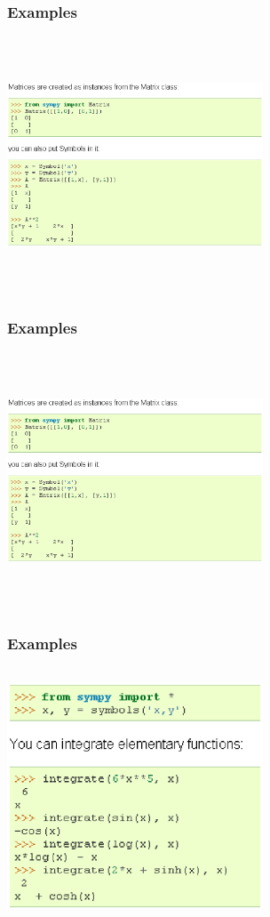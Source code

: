 \documentclass[dvips]{beamer}
\begin{document}
\begin{frame}
\frametitle{Examples}
\includegraphics[height=3in,width=3in]{ex2.ps}
\end{frame}

\begin{frame}
\frametitle{Examples}
\includegraphics[height=3in,width=3in]{ex3.ps}
\end{frame}

\begin{frame}
\frametitle{Examples}
\includegraphics[height=3in,width=3in]{ex4.ps}
\end{frame}
\end{document}
